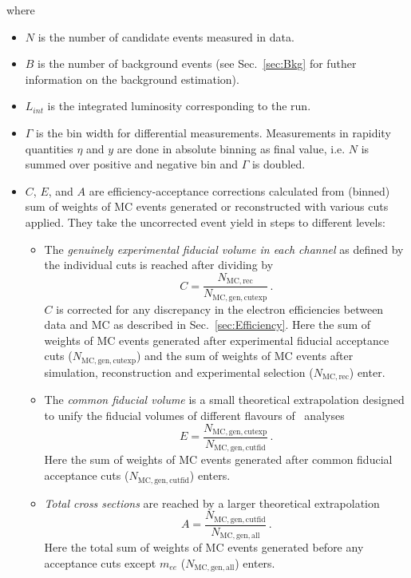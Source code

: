 where
\begin{itemize}
\item {\bfseries $N$} is the number of candidate events measured in data.
\item {\bfseries $B$} is the number of background events (see Sec.~\ref{sec:Bkg} for futher information on the background estimation).
\item {\bfseries $L_{int}$} is the integrated luminosity corresponding to the run.
\item {\bfseries $\Gamma$} is the bin width for differential measurements. Measurements in rapidity quantities $\eta$ and $y$ are done in absolute binning as final value, i.e. $N$ is summed over positive and negative bin and $\Gamma$ is doubled.
\item $C$, $E$, and $A$ are efficiency-acceptance corrections calculated from (binned) sum of weights of MC events generated or reconstructed with various cuts applied. They take the uncorrected event yield in steps to different levels:
  \begin{itemize}
  \item The \textit{genuinely experimental fiducial volume in each channel} as defined by the individual cuts is reached after dividing by 
    \begin{equation}
      C = \frac{N_\mathrm{MC, rec}}{N_\mathrm{MC, gen, cutexp}}\,.
    \end{equation}
    $C$ is corrected for any discrepancy in the electron efficiencies between data and MC as described in Sec.~\ref{sec:Efficiency}. Here the sum of weights of MC events generated after experimental fiducial acceptance cuts ($N_\mathrm{MC, gen, cutexp}$) and the sum of weights of MC events after simulation, reconstruction and experimental selection ($N_\mathrm{MC, rec}$) enter.
  \item The \textit{common fiducial volume} is a small theoretical extrapolation designed to unify the fiducial volumes of different flavours of \Zll\ analyses
    \begin{equation}
      E = \frac{N_\mathrm{MC, gen, cutexp}}{N_\mathrm{MC, gen, cutfid}}\,.
    \end{equation}
    Here the sum of weights of MC events generated after common fiducial acceptance cuts ($N_\mathrm{MC, gen, cutfid}$) enters.
  \item \textit{Total cross sections} are reached by a larger theoretical extrapolation
    \begin{equation}
      A = \frac{N_\mathrm{MC, gen, cutfid}}{N_\mathrm{MC, gen, all}}\,.
    \end{equation}
    Here the total sum of weights of MC events generated before any acceptance cuts except $m_{ee}$ ($N_\mathrm{MC, gen, all}$) enters.
  \end{itemize}
\end{itemize}

